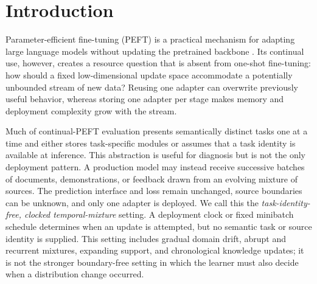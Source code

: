 \section{Introduction}
\label{sec:introduction}

Parameter-efficient fine-tuning (PEFT) is a practical mechanism for adapting
large language models without updating the pretrained backbone
\citep{hu2022lora,houlsby2019adapter}. Its continual use, however, creates a
resource question that is absent from one-shot fine-tuning: how should a fixed
low-dimensional update space accommodate a potentially unbounded stream of new
data? Reusing one adapter can overwrite previously useful behavior, whereas
storing one adapter per stage makes memory and deployment complexity grow with
the stream.

Much of continual-PEFT evaluation presents semantically distinct tasks one at a
time and either stores task-specific modules or assumes that a task identity is
available at inference. This abstraction is useful for diagnosis but is not the
only deployment pattern. A production model may instead receive successive
batches of documents, demonstrations, or feedback drawn from an evolving
mixture of sources. The prediction interface and loss remain unchanged, source
boundaries can be unknown, and only one adapter is deployed. We call this the
\emph{task-identity-free, clocked temporal-mixture} setting. A deployment clock
or fixed minibatch schedule determines when an update is attempted, but no
semantic task or source identity is supplied. This setting includes gradual
domain drift, abrupt and recurrent mixtures, expanding support, and
chronological knowledge updates; it is not the stronger boundary-free setting
in which the learner must also decide when a distribution change occurred.

